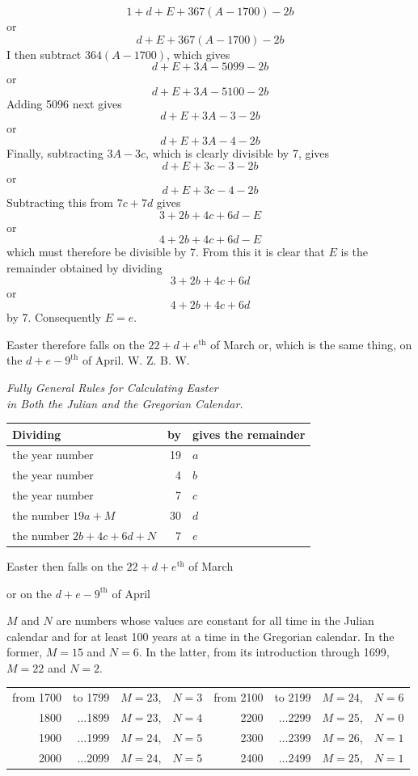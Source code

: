 %
\[
1+d+E+367(A-1700)-2b
\]
or
\[
d+E+367(A-1700)-2b
\]
I then subtract $364(A-1700)$, which gives
\begingroup{}
\[
d+E+3A-5099-2b
\]
\endgroup
or
\[
d+E+3A-5100-2b
\]
Adding 5096 next gives
\[
d+E+3A-3-2b
\]
or
\[
d+E+3A-4-2b
\]
Finally, subtracting $3A-3c$, which is clearly divisible by 7, gives
\[
d+E+3c-3-2b
\]
or
\[
d+E+3c-4-2b
\]
Subtracting this from $7c+7d$ gives
\[
3+2b+4c+6d-E
\]
or
\[
4+2b+4c+6d-E
\]
which must therefore be divisible by 7. From this it is clear that $E$ is the remainder obtained by dividing
\[
3+2b+4c+6d
\]
or
\[
4+2b+4c+6d
\]
by 7. Consequently $E=e$.

Easter therefore falls on the $22+d+e^{\mathrm{th}}$ of March or, which is the same thing, on the $d+e-9^{\mathrm{th}}$ of April. W. Z. B. W.

%
\begin{center}\textit{Fully General Rules for Calculating Easter\\
in Both the Julian and the Gregorian Calendar.}\end{center}
\begin{center}
\begin{tabular}{l|r|l}
Dividing & by & gives the remainder\\\hline
the year number & 19 & $a$\\
the year number & 4 & $b$\\
the year number & 7 & $c$\\
the number $19a+M$ & 30 & $d$\\
the number $2b+4c+6d+N$ & 7 & $e$\\\hline
\end{tabular}\par
Easter then falls on the $22+d+e^{\mathrm{th}}$ of March\par
or on the $d+e-9^{\mathrm{th}}$ of April
\end{center}

$M$ and $N$ are numbers whose values are constant for all time in the Julian calendar and for at least 100 years at a time in the Gregorian calendar. In the former, $M=15$ and $N=6$. In the latter, from its introduction through 1699, $M=22$ and $N=2$.

\begin{center}\small
\setlength{\tabcolsep}{5pt}\begin{tabular}{rrll|rrll}
from 1700 & to 1799 & $M=23$, & $N=3$ & from 2100 & to 2199 & $M=24$, & $N=6$\\
1800 & $\ldots$1899 & $M=23$, & $N=4$ & 2200 & $\ldots$2299 & $M=25$, & $N=0$\\
1900 & $\ldots$1999 & $M=24$, & $N=5$ & 2300 & $\ldots$2399 & $M=26$, & $N=1$\\
2000 & $\ldots$2099 & $M=24$, & $N=5$ & 2400 & $\ldots$2499 & $M=25$, & $N=1$
\end{tabular}
\end{center}

